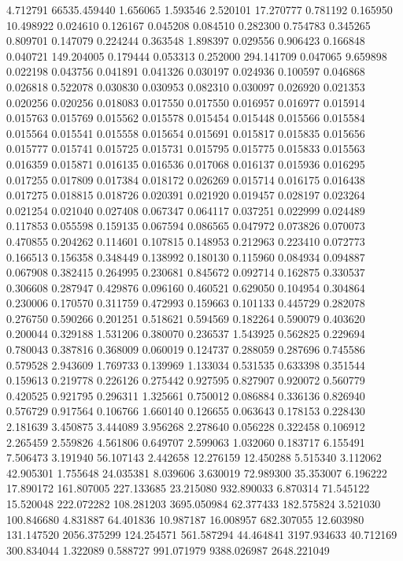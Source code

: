 4.712791
66535.459440
1.656065
1.593546
2.520101
17.270777
0.781192
0.165950
10.498922
0.024610
0.126167
0.045208
0.084510
0.282300
0.754783
0.345265
0.809701
0.147079
0.224244
0.363548
1.898397
0.029556
0.906423
0.166848
0.040721
149.204005
0.179444
0.053313
0.252000
294.141709
0.047065
9.659898
0.022198
0.043756
0.041891
0.041326
0.030197
0.024936
0.100597
0.046868
0.026818
0.522078
0.030830
0.030953
0.082310
0.030097
0.026920
0.021353
0.020256
0.020256
0.018083
0.017550
0.017550
0.016957
0.016977
0.015914
0.015763
0.015769
0.015562
0.015578
0.015454
0.015448
0.015566
0.015584
0.015564
0.015541
0.015558
0.015654
0.015691
0.015817
0.015835
0.015656
0.015777
0.015741
0.015725
0.015731
0.015795
0.015775
0.015833
0.015563
0.016359
0.015871
0.016135
0.016536
0.017068
0.016137
0.015936
0.016295
0.017255
0.017809
0.017384
0.018172
0.026269
0.015714
0.016175
0.016438
0.017275
0.018815
0.018726
0.020391
0.021920
0.019457
0.028197
0.023264
0.021254
0.021040
0.027408
0.067347
0.064117
0.037251
0.022999
0.024489
0.117853
0.055598
0.159135
0.067594
0.086565
0.047972
0.073826
0.070073
0.470855
0.204262
0.114601
0.107815
0.148953
0.212963
0.223410
0.072773
0.166513
0.156358
0.348449
0.138992
0.180130
0.115960
0.084934
0.094887
0.067908
0.382415
0.264995
0.230681
0.845672
0.092714
0.162875
0.330537
0.306608
0.287947
0.429876
0.096160
0.460521
0.629050
0.104954
0.304864
0.230006
0.170570
0.311759
0.472993
0.159663
0.101133
0.445729
0.282078
0.276750
0.590266
0.201251
0.518621
0.594569
0.182264
0.590079
0.403620
0.200044
0.329188
1.531206
0.380070
0.236537
1.543925
0.562825
0.229694
0.780043
0.387816
0.368009
0.060019
0.124737
0.288059
0.287696
0.745586
0.579528
2.943609
1.769733
0.139969
1.133034
0.531535
0.633398
0.351544
0.159613
0.219778
0.226126
0.275442
0.927595
0.827907
0.920072
0.560779
0.420525
0.921795
0.296311
1.325661
0.750012
0.086884
0.336136
0.826940
0.576729
0.917564
0.106766
1.660140
0.126655
0.063643
0.178153
0.228430
2.181639
3.450875
3.444089
3.956268
2.278640
0.056228
0.322458
0.106912
2.265459
2.559826
4.561806
0.649707
2.599063
1.032060
0.183717
6.155491
7.506473
3.191940
56.107143
2.442658
12.276159
12.450288
5.515340
3.112062
42.905301
1.755648
24.035381
8.039606
3.630019
72.989300
35.353007
6.196222
17.890172
161.807005
227.133685
23.215080
932.890033
6.870314
71.545122
15.520048
222.072282
108.281203
3695.050984
62.377433
182.575824
3.521030
100.846680
4.831887
64.401836
10.987187
16.008957
682.307055
12.603980
131.147520
2056.375299
124.254571
561.587294
44.464841
3197.934633
40.712169
300.834044
1.322089
0.588727
991.071979
9388.026987
2648.221049
